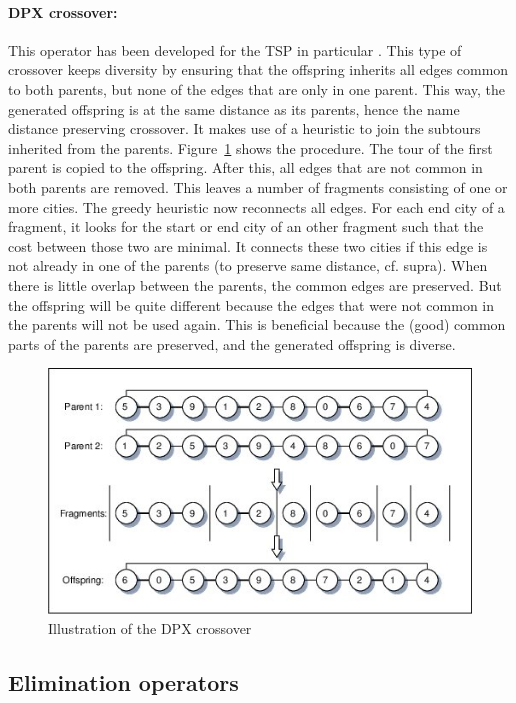 \documentclass[a4paper,10pt]{article}
\begin{document}
\paragraph{DPX crossover:} This operator has been developed for the TSP in particular \cite{dpxcrossover}. This type of crossover keeps diversity by ensuring that the offspring inherits all edges common to both parents, but none of the edges that are only in one parent. This way, the generated offspring is at the same distance as its parents, hence the name distance preserving crossover. It makes use of a heuristic to join the subtours inherited from the parents. Figure~\ref{fig:dpxcrossover} shows the procedure. The tour of the first parent is copied to the offspring. After this, all edges that are not common in both parents are removed. This leaves a number of fragments consisting of one or more cities. The greedy heuristic now reconnects all edges. For each end city of a fragment, it looks for the start or end city of an other fragment such that the cost between those two are minimal. It connects these two cities if this edge is not already in one of the parents (to preserve same distance, cf. supra).
When there is little overlap between the parents, the common edges are preserved. But the offspring will be quite different because the edges that were not common in the parents will not be used again. This is beneficial because the (good) common parts of the parents are preserved, and the generated offspring is diverse. 

\begin{figure}[H]
  \centering
  \includegraphics[width=.6\textwidth]{img/dpxcrossover.jpg}
  \caption{Illustration of the DPX crossover \cite{dpxcrossover} }
  \label{fig:dpxcrossover}
\end{figure}


\subsection{Elimination operators}\label{ssec:elimination}
\end{document}

